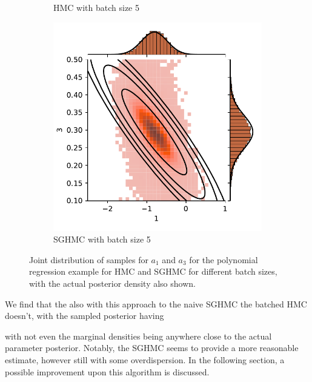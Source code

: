 \begin{figure}[htbp]
\begin{subfigure}[b]{0.4\textwidth}
        \caption{HMC with batch size 5}
    \end{subfigure}
    \begin{subfigure}[b]{0.4\textwidth}
        \centering
        \includegraphics[width=\textwidth]{Figures/simulated_joint_SGHMC_5.pdf} 
        \caption{SGHMC with batch size 5}
    \end{subfigure}
    \caption{Joint distribution of samples for $a_1$ and $a_3$ for the polynomial regression example for HMC and SGHMC for different batch sizes, with the actual posterior density also shown.}
    \label{fig:simulated_joint_comp}
\end{figure}
We find that the also with this approach to the naive SGHMC the batched HMC doesn't, with the sampled posterior having 

with not even the marginal densities being anywhere close to the actual parameter posterior.
Notably, the SGHMC seems to provide a more reasonable estimate, however still with some overdispersion.
In the following section, a possible improvement upon this algorithm is discussed.
